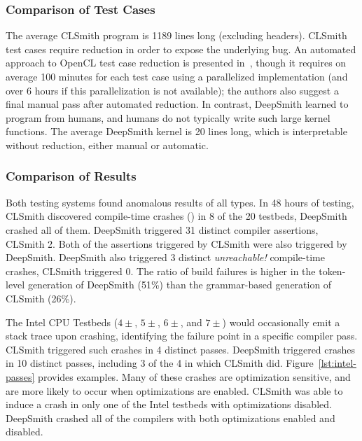 \subsubsection{Comparison of Test Cases} %

The average CLSmith program is 1189 lines long (excluding headers). CLSmith test
cases require reduction in order to expose the underlying bug. An automated
approach to OpenCL test case reduction is presented in~\cite{Pflanzer2016},
though it requires on average 100 minutes for each test case using a
parallelized implementation (and over 6 hours if this parallelization is not
available); the authors also suggest a final manual pass after automated
reduction. In contrast, DeepSmith learned to program from humans, and humans do
not typically write such large kernel functions. The average DeepSmith kernel is
20 lines long, which is interpretable without reduction, either manual or
automatic.


\subsubsection{Comparison of Results} %

Both testing systems found anomalous results of all types. In 48 hours of
testing, CLSmith discovered compile-time crashes (\bc) in 8 of the 20 testbeds,
DeepSmith crashed all of them. DeepSmith triggered 31 distinct compiler
assertions, CLSmith 2. Both of the assertions triggered by CLSmith were also
triggered by DeepSmith. DeepSmith also triggered 3 distinct \emph{unreachable!}
compile-time crashes, CLSmith triggered 0. The ratio of build failures is higher
in the token-level generation of DeepSmith (51\%) than the grammar-based
generation of CLSmith (26\%).

The Intel CPU Testbeds ($4\pm$, $5\pm$, $6\pm$, and $7\pm$) would occasionally
emit a stack trace upon crashing, identifying the failure point in a specific
compiler pass. CLSmith triggered such crashes in 4 distinct passes. DeepSmith
triggered crashes in 10 distinct passes, including 3 of the 4 in which CLSmith
did. Figure~\ref{lst:intel-passes} provides examples. Many of these crashes are
optimization sensitive, and are more likely to occur when optimizations are
enabled. CLSmith was able to induce a crash in only one of the Intel testbeds
with optimizations disabled. DeepSmith crashed all of the compilers with both
optimizations enabled and disabled.


